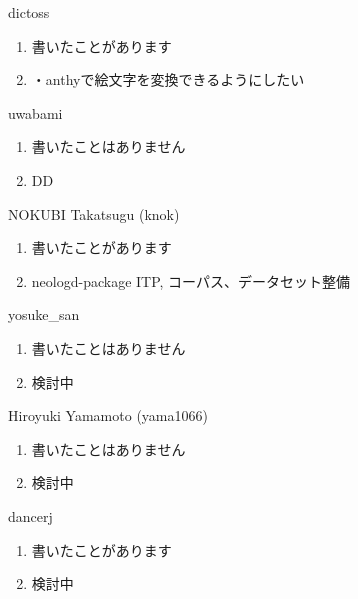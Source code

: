 \begin{prework}{ dictoss }
  \begin{enumerate}
  \item 書いたことがあります
  \item ・anthyで絵文字を変換できるようにしたい
  \end{enumerate}
\end{prework}

\begin{prework}{ uwabami }
  \begin{enumerate}
  \item 書いたことはありません
  \item DD
  \end{enumerate}
\end{prework}

\begin{prework}{ NOKUBI Takatsugu (knok) }
  \begin{enumerate}
  \item 書いたことがあります
  \item neologd-package ITP, コーパス、データセット整備
  \end{enumerate}
\end{prework}

\begin{prework}{ yosuke\_san }
  \begin{enumerate}
  \item 書いたことはありません
  \item 検討中
  \end{enumerate}
\end{prework}

\begin{prework}{ Hiroyuki Yamamoto (yama1066) }
  \begin{enumerate}
  \item 書いたことはありません
  \item 検討中
  \end{enumerate}
\end{prework}

\begin{prework}{ dancerj }
  \begin{enumerate}
  \item 書いたことがあります
  \item 検討中
  \end{enumerate}
\end{prework}
